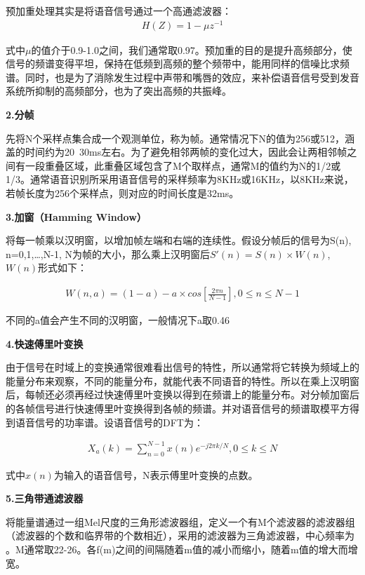 \documentclass[11pt,a4paper,UTF8]{ctexart}
\begin{document}
	预加重处理其实是将语音信号通过一个高通滤波器：
	\begin{align}
	H(Z)=1-\mu{}z^{-1}
	\end{align}
	
	式中$\mu$的值介于0.9-1.0之间，我们通常取0.97。预加重的目的是提升高频部分，使信号的频谱变得平坦，保持在低频到高频的整个频带中，能用同样的信噪比求频谱。同时，也是为了消除发生过程中声带和嘴唇的效应，来补偿语音信号受到发音系统所抑制的高频部分，也为了突出高频的共振峰。
	
	\textbf{2.分帧}
	
	先将N个采样点集合成一个观测单位，称为帧。通常情况下N的值为256或512，涵盖的时间约为20~30ms左右。为了避免相邻两帧的变化过大，因此会让两相邻帧之间有一段重叠区域，此重叠区域包含了M个取样点，通常M的值约为N的1/2或1/3。通常语音识别所采用语音信号的采样频率为8KHz或16KHz，以8KHz来说，若帧长度为256个采样点，则对应的时间长度是32ms。
	
	\textbf{3.加窗（Hamming Window）}
	
	将每一帧乘以汉明窗，以增加帧左端和右端的连续性。假设分帧后的信号为S(n), n=0,1,…,N-1, N为帧的大小，那么乘上汉明窗后$S'(n)=S(n)\times{}W(n)$,$W(n)$形式如下：
	
	\begin{align}
	W(n,a)=(1-a)-a\times{}cos[\frac{2\pi{}n}{N-1}], 0\le{}n\le{}N-1
	\end{align}
	
	不同的a值会产生不同的汉明窗，一般情况下a取0.46
	
	\textbf{4.快速傅里叶变换}
	
	由于信号在时域上的变换通常很难看出信号的特性，所以通常将它转换为频域上的能量分布来观察，不同的能量分布，就能代表不同语音的特性。所以在乘上汉明窗后，每帧还必须再经过快速傅里叶变换以得到在频谱上的能量分布。对分帧加窗后的各帧信号进行快速傅里叶变换得到各帧的频谱。并对语音信号的频谱取模平方得到语音信号的功率谱。设语音信号的DFT为：
	
	\begin{align}
	X_a(k)=\sum_{n=0}^{N-1}x(n)e^{-j2\pi{}k/N}, 0\le{}k\le{}N
	\end{align}
	
	式中$x(n)$为输入的语音信号，N表示傅里叶变换的点数。
	
	\textbf{5.三角带通滤波器}
	
	将能量谱通过一组Mel尺度的三角形滤波器组，定义一个有M个滤波器的滤波器组（滤波器的个数和临界带的个数相近），采用的滤波器为三角滤波器，中心频率为 。M通常取22-26。各f(m)之间的间隔随着m值的减小而缩小，随着m值的增大而增宽。
	
\end{document}
